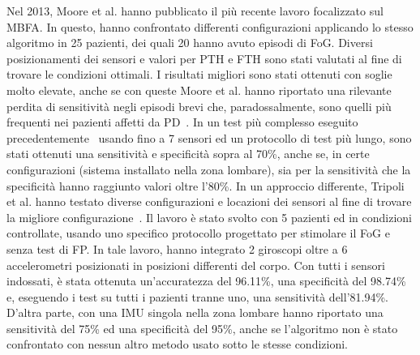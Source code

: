 Nel 2013, Moore et al. hanno pubblicato il più recente lavoro focalizzato sul MBFA. In questo, hanno confrontato differenti configurazioni applicando lo stesso algoritmo in 25 pazienti, dei quali 20 hanno avuto episodi di FoG. Diversi posizionamenti dei sensori e valori per PTH e FTH sono stati valutati al fine di trovare le condizioni ottimali. I risultati migliori sono stati ottenuti con soglie molto elevate, anche se con queste Moore et al. hanno riportato una rilevante perdita di sensitività negli episodi brevi che, paradossalmente, sono quelli più frequenti nei pazienti affetti da PD~\cite{27}. In un test più complesso eseguito precedentemente~\cite{20} usando fino a 7 sensori ed un protocollo di test più lungo, sono stati ottenuti una sensitività e specificità sopra al 70\%, anche se, in certe configurazioni (sistema installato nella zona lombare), sia per la sensitività che la specificità hanno raggiunto valori oltre l'80\%. In un approccio differente, Tripoli et al. hanno testato diverse configurazioni e locazioni dei sensori al fine di trovare la migliore configurazione~\cite{52}. Il lavoro è stato svolto con 5 pazienti ed in condizioni controllate, usando uno specifico protocollo progettato per stimolare il FoG e senza test di FP. In tale lavoro, hanno integrato 2 giroscopi oltre a 6 accelerometri posizionati in posizioni differenti del corpo. Con tutti i sensori indossati, è stata ottenuta un'accuratezza del 96.11\%, una specificità del 98.74\% e, eseguendo i test su tutti i pazienti tranne uno, una sensitività dell'81.94\%. D'altra parte, con una IMU singola nella zona lombare hanno riportato una sensitività del 75\% ed una specificità del 95\%, anche se l'algoritmo non è stato confrontato con nessun altro metodo usato sotto le stesse condizioni. \newline
